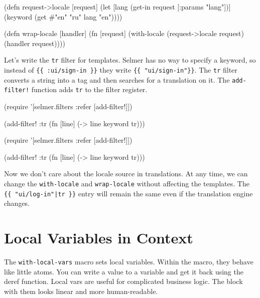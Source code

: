 \else

\begin{clojure}
(defn request->locale [request]
  (let [lang (get-in request [:params "lang"])]
    (keyword (get #{"en" "ru"} lang "en"))))

(defn wrap-locale [handler]
  (fn [request]
    (with-locale (request->locale request)
      (handler request))))
\end{clojure}

\fi

Let's write the \verb|tr| filter for templates.
Selmer has no way to specify a keyword, so instead of \verb|{{ :ui/sign-in }}| they write \verb|{{ "ui/sign-in"}}|.
The \verb|tr| filter converts a string into a tag and then searches for a translation on it. The \verb|add-filter!| function adds \verb|tr| to the filter register.

\ifx\DEVICETYPE\MOBILE

\begin{clojure}
(require
 '[selmer.filters :refer [add-filter!]])

(add-filter! :tr
 (fn [line]
   (-> line keyword tr)))
\end{clojure}

\else

\begin{clojure}
(require '[selmer.filters :refer [add-filter!]])

(add-filter! :tr
 (fn [line]
   (-> line keyword tr)))
\end{clojure}

\fi

Now we don't care about the locale source in translations. At any time, we can change the \verb|with-locale| and \verb|wrap-locale| without affecting the templates.
The \verb={{ "ui/log-in"|tr }}= entry will remain the same even if the translation engine changes.

\section{Local Variables in Context}


The \verb|with-local-vars| macro sets local variables. Within the macro, they behave like little atoms. You can write a value to a variable and get it back using the deref function.
Local vars are useful for complicated business logic. The block with them looks linear and more human-readable.


